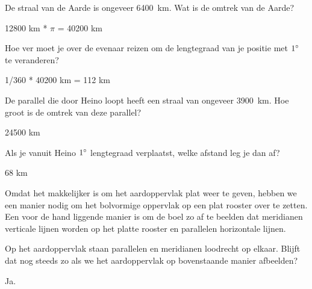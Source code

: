 \begin{opgave}
	\begin{subopgave}
		De straal van de Aarde is ongeveer 6400~km. Wat is de omtrek van de Aarde?
		\begin{antwoord}
			12800 km * $\pi$ = 40200 km
		\end{antwoord}			
	\end{subopgave}
	\begin{subopgave}
		Hoe ver moet je over de evenaar reizen om de lengtegraad van je positie met $1\degree$ te veranderen?
		\begin{antwoord}
			1/360 * 40200 km = 112 km
		\end{antwoord}
	\end{subopgave}
	\begin{subopgave}
		De parallel die door Heino loopt heeft een straal van ongeveer 3900~km. Hoe groot is de omtrek van deze parallel?
		\begin{antwoord}
			24500 km
		\end{antwoord}
	\end{subopgave}
	\begin{subopgave}
		Als je vanuit Heino $1\degree$ lengtegraad verplaatst, welke afstand leg je dan af?
		\begin{antwoord}
			68 km
		\end{antwoord}
	\end{subopgave}
\end{opgave}

Omdat het makkelijker is om het aardoppervlak plat weer te geven, hebben we een manier nodig om het bolvormige oppervlak op een plat rooster over te zetten. Een voor de hand liggende manier is om de boel zo af te beelden dat meridianen verticale lijnen worden op het platte rooster en parallelen horizontale lijnen.

\begin{opgave}
	Op het aardoppervlak staan parallelen en meridianen loodrecht op elkaar. Blijft dat nog steeds zo als we het aardoppervlak op bovenstaande manier afbeelden?
	\begin{antwoord}
		Ja.
	\end{antwoord}
\end{opgave}

